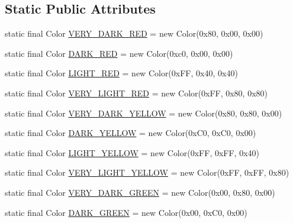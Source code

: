 \subsection*{Static Public Attributes}
\begin{DoxyCompactItemize}
\item 
static final Color \mbox{\hyperlink{classorg_1_1jfree_1_1chart_1_1_chart_color_a0e4c09f6e4d5197b9390e6ecba8584e1}{V\+E\+R\+Y\+\_\+\+D\+A\+R\+K\+\_\+\+R\+ED}} = new Color(0x80, 0x00, 0x00)
\item 
static final Color \mbox{\hyperlink{classorg_1_1jfree_1_1chart_1_1_chart_color_a2a74f02d777e476efd34347c10aff786}{D\+A\+R\+K\+\_\+\+R\+ED}} = new Color(0xc0, 0x00, 0x00)
\item 
static final Color \mbox{\hyperlink{classorg_1_1jfree_1_1chart_1_1_chart_color_a0b6e369370bcc500fdd90a5112ca98bc}{L\+I\+G\+H\+T\+\_\+\+R\+ED}} = new Color(0x\+F\+F, 0x40, 0x40)
\item 
static final Color \mbox{\hyperlink{classorg_1_1jfree_1_1chart_1_1_chart_color_a53f793e0ffa2a50cd13b3c57eb07fb0f}{V\+E\+R\+Y\+\_\+\+L\+I\+G\+H\+T\+\_\+\+R\+ED}} = new Color(0x\+F\+F, 0x80, 0x80)
\item 
static final Color \mbox{\hyperlink{classorg_1_1jfree_1_1chart_1_1_chart_color_ad89b0a71485b4ea6cd1aef451d3bd521}{V\+E\+R\+Y\+\_\+\+D\+A\+R\+K\+\_\+\+Y\+E\+L\+L\+OW}} = new Color(0x80, 0x80, 0x00)
\item 
static final Color \mbox{\hyperlink{classorg_1_1jfree_1_1chart_1_1_chart_color_a334b5982a3c49ad2f9b4bfd92664b1d3}{D\+A\+R\+K\+\_\+\+Y\+E\+L\+L\+OW}} = new Color(0x\+C0, 0x\+C0, 0x00)
\item 
static final Color \mbox{\hyperlink{classorg_1_1jfree_1_1chart_1_1_chart_color_a6a01e0a3333ed080f68692e106d9b44e}{L\+I\+G\+H\+T\+\_\+\+Y\+E\+L\+L\+OW}} = new Color(0x\+F\+F, 0x\+F\+F, 0x40)
\item 
static final Color \mbox{\hyperlink{classorg_1_1jfree_1_1chart_1_1_chart_color_a89ed157730387d79676dc7972959fc32}{V\+E\+R\+Y\+\_\+\+L\+I\+G\+H\+T\+\_\+\+Y\+E\+L\+L\+OW}} = new Color(0x\+F\+F, 0x\+F\+F, 0x80)
\item 
static final Color \mbox{\hyperlink{classorg_1_1jfree_1_1chart_1_1_chart_color_ab3b3ea85e9fbd74a1a92876e30d5ba51}{V\+E\+R\+Y\+\_\+\+D\+A\+R\+K\+\_\+\+G\+R\+E\+EN}} = new Color(0x00, 0x80, 0x00)
\item 
static final Color \mbox{\hyperlink{classorg_1_1jfree_1_1chart_1_1_chart_color_a3adc2695e88786a0470dd8cdadafd2bf}{D\+A\+R\+K\+\_\+\+G\+R\+E\+EN}} = new Color(0x00, 0x\+C0, 0x00)

\end{DoxyCompactItemize}
